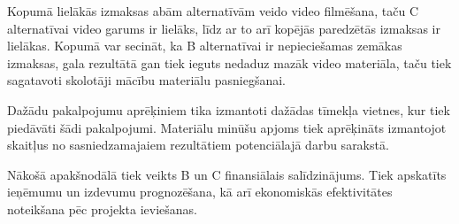 \par
Kopumā lielākās izmaksas abām alternatīvām veido video filmēšana, taču C alternatīvai video garums
ir lielāks, līdz ar to arī kopējās paredzētās izmaksas ir lielākas. Kopumā var secināt, ka B alternatīvai
ir nepieciešamas zemākas izmaksas, gala rezultātā gan tiek ieguts nedaduz mazāk video materiāla, taču tiek
sagatavoti skolotāji mācību materiālu pasniegšanai.
\par
Dažādu pakalpojumu aprēķiniem tika izmantoti dažādas tīmekļa vietnes, kur tiek piedāvāti šādi pakalpojumi.
Materiālu minūšu apjoms tiek aprēķināts izmantojot skaitļus no sasniedzamajaiem rezultātiem potenciālajā
darbu sarakstā.
\par
Nākošā apakšnodālā tiek veikts B un C finansiālais salīdzinājums. Tiek apskatīts 
ieņēmumu un izdevumu prognozēšana, kā arī ekonomiskās efektivitātes noteikšana pēc 
projekta ieviešanas.

  
